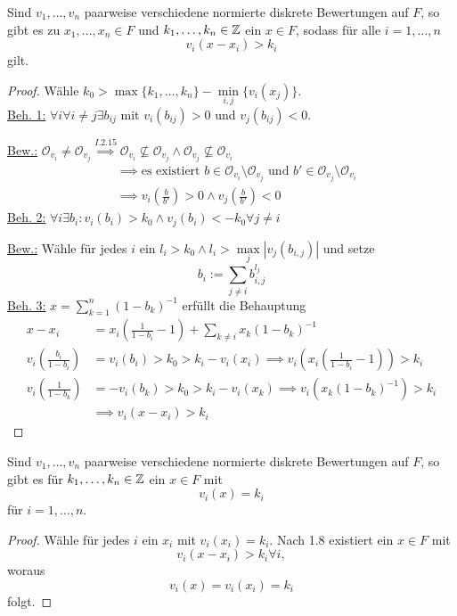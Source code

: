 \begin{theorem}
    Sind $v_1,\ldots,v_n$ paarweise verschiedene normierte diskrete Bewertungen auf $F$, so gibt es zu 
    $x_1,\ldots,x_n \in F$ und $k_1, \ldots,k_n \in \mathbb{Z}$ ein $x \in F$, sodass für alle $i = 1, \ldots,n$
    $$ v_i(x - x_i) > k_i$$
    gilt.  
\end{theorem}
\begin{proof}
    Wähle $k_0 > \max\{k_1, \ldots, k_n\} - \min\limits_{i,j}\{v_i(x_j)\}$.\\
    \underline{Beh. 1:} $\forall i \forall i\ne j \exists b_{ij}$ mit $v_i(b_{ij}) > 0$ und $v_j(b_{ij}) < 0$.

    \underline{Bew.:} $\mathcal{O}_{v_i} \ne \mathcal{O}_{v_j} \stackrel{I.2.15}{\implies} \mathcal{O}_{v_i} \not \subseteq \mathcal{O}_{v_j}
    \land \mathcal{O}_{v_j} \not \subseteq \mathcal{O}_{v_i}$ 
    \begin{align*}
        & \implies \text{es existiert } b \in \mathcal{O}_{v_i} \setminus \mathcal{O}_{v_j} \text{ und } b' \in \mathcal{O}_{v_j} \setminus \mathcal{O}_{v_i}\\
        & \implies v_i(\frac{b}{b'}) > 0 \land v_j(\frac{b}{b'}) < 0
    \end{align*}
    \underline{Beh. 2:} $\forall i \exists b_i: v_i(b_i) > k_0 \land v_j(b_i) < -k_0 \forall j \ne i$

    \underline{Bew.:} Wähle für jedes $i$ ein $l_i > k_0 \land l_i > \max\limits_{j}|v_{j}(b_{i,j})|$ und setze
    $$ b_i := \sum\limits_{j \ne i} b_{i,j}^{l_j}$$
    \underline{Beh. 3:} $ x = \sum\limits_{k=1}^n (1-b_k)^{-1}$ erfüllt die Behauptung
    \begin{align*}
        x - x_i &= x_i \left(\frac{1}{1-b_i} - 1\right) + \sum\limits_{k\ne i} x_k (1-b_k)^{-1}\\
        v_i\left(\frac{b_i}{1-b_i}\right) &= v_i(b_i) > k_0 > k_i - v_i(x_i) \implies v_i\left(x_i\left(\frac{1}{1-b_i} - 1\right)\right) > k_i\\
        v_i\left(\frac{1}{1-b_k}\right) &= - v_i(b_k) > k_0 > k_i - v_i(x_k) \implies v_i(x_k(1-b_k)^{-1}) > k_i\\
        & \implies v_i(x-x_i) > k_i
    \end{align*}

\end{proof}

\begin{korollar}
    Sind $v_1,\ldots,v_n$ paarweise verschiedene normierte diskrete Bewertungen auf $F$, so gibt es für $k_1,\ldots,k_n \in \mathbb{Z}$
    ein $x \in F$ mit
    $$ v_i(x) = k_i$$
    für $i= 1,\ldots,n$.
\end{korollar}
\begin{proof}
    Wähle für jedes $i$ ein $x_i$ mit $v_i(x_i)=k_i$. 
    Nach 1.8 existiert ein $x \in F$ mit $$v_i(x-x_i) > k_i \forall i,$$
    woraus $$ v_i(x) = v_i(x_i) = k_i$$
    folgt.
\end{proof}

